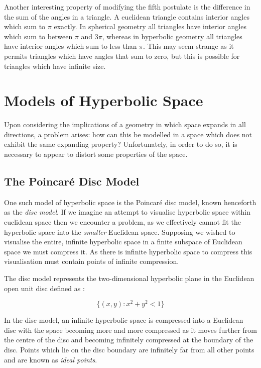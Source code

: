 Another interesting property of modifying the fifth postulate is the difference in the sum of the angles in a triangle. A euclidean triangle contains interior angles which sum to $\pi$ exactly. In spherical geometry all triangles have interior angles which sum to between $\pi$ and 3$\pi$, whereas in hyperbolic geometry all triangles have interior angles which sum to less than $\pi$. This may seem strange as it permits triangles which have angles that sum to zero, but this is possible for triangles which have infinite size.

\section{Models of Hyperbolic Space}
\label{sec:LitReviewVisHyperbolic}

Upon considering the implications of a geometry in which space expands in all directions, a problem arises: how can this be modelled in a space which does not exhibit the same expanding property? Unfortunately, in order to do so, it is necessary to appear to distort some properties of the space.

\subsection{The Poincar\'{e} Disc Model}
\label{sec:discmodel}

One such model of hyperbolic space is the Poincar\'{e} disc model, known henceforth as the \textit{disc model}. If we imagine an attempt to visualise hyperbolic space within euclidean space then we encounter a problem, as we effectively cannot fit the hyperbolic space into the \textit{smaller} Euclidean space. Supposing we wished to visualise the entire, infinite hyperbolic space in a finite subspace of Euclidean space we must compress it. As there is infinite hyperbolic space to compress this visualisation must contain points of infinite compression.

The disc model represents the two-dimensional hyperbolic plane in the Euclidean open unit disc defined as \cite{blair_inversion_2000}:

\begin{equation}
\label{eq:open_unit_disc_eq}
\{(x,y):x^2 + y^2 <1\}
\end{equation}
 

In the disc model, an infinite hyperbolic space is compressed into a Euclidean disc with the space becoming more and more compressed as it moves further from the centre of the disc and becoming infinitely compressed at the boundary of the disc. Points which lie on the disc boundary are infinitely far from all other points and are known as \textit{ideal points}.


